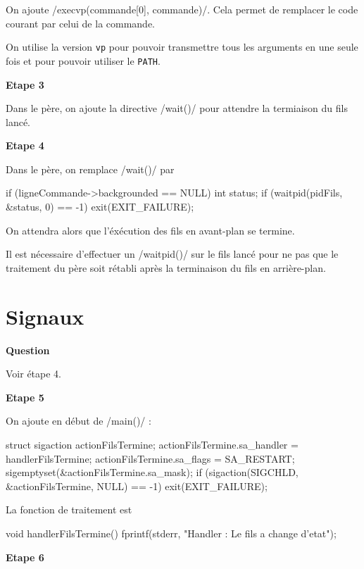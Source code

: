 \documentclass[a4paper, 12pt]{article}
\begin{document}
\bigskip
On ajoute \cinline/execvp(commande[0], commande)/. Cela permet de remplacer le code courant par celui de la commande.

On utilise la version \texttt{vp} pour pouvoir transmettre tous les arguments en une seule fois et pour pouvoir utiliser le \texttt{PATH}.

\bigskip
\noindent
\textbf{Etape 3}

\bigskip
Dans le père, on ajoute la directive \cinline/wait()/ pour attendre la termiaison du fils lancé.

\bigskip
\noindent
\textbf{Etape 4}

\bigskip
Dans le père, on remplace \cinline/wait()/ par
\begin{ccode}
if (ligneCommande->backgrounded == NULL) {
	int status;
	if (waitpid(pidFils, &status, 0) == -1) {
		exit(EXIT_FAILURE);
	}
}
\end{ccode}

On attendra alors que l'éxécution des fils en avant-plan se termine.

Il est nécessaire d'effectuer un \cinline/waitpid()/ sur le fils lancé pour ne pas que le traitement du père soit rétabli après la terminaison du fils en arrière-plan.

\newpage
\part{Signaux}

\noindent
\textbf{Question}

\bigskip
Voir étape 4.

\bigskip
\noindent
\textbf{Etape 5}

\bigskip
On ajoute en début de \cinline/main()/ :

\begin{ccode}
struct sigaction actionFilsTermine;
actionFilsTermine.sa_handler = handlerFilsTermine;
actionFilsTermine.sa_flags = SA_RESTART;
sigemptyset(&actionFilsTermine.sa_mask);
if (sigaction(SIGCHLD, &actionFilsTermine, NULL) == -1) {
	exit(EXIT_FAILURE);
}
\end{ccode}

La fonction de traitement est

\begin{ccode}
void handlerFilsTermine() {
	fprintf(stderr, "Handler : Le fils a change d'etat\n");
}
\end{ccode}

\bigskip
\noindent
\textbf{Etape 6}
\end{document}
